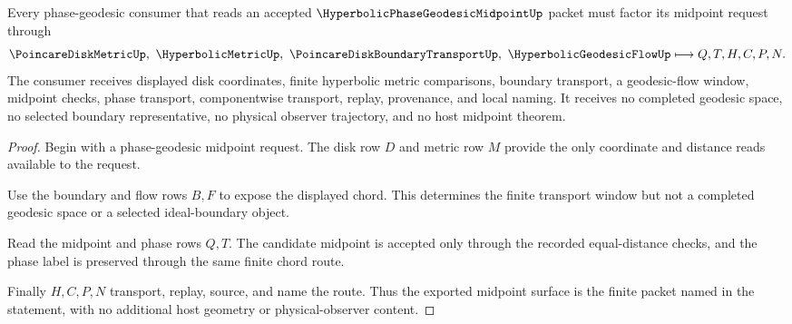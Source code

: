 \begin{theorem}
\label{thm:hyperbolic-phase-geodesic-midpoint-route}
Every phase-geodesic consumer that reads an accepted $\HyperbolicPhaseGeodesicMidpointUp$ packet must factor its midpoint request through
$$
\PoincareDiskMetricUp,\ \HyperbolicMetricUp,\ \PoincareDiskBoundaryTransportUp,\ \HyperbolicGeodesicFlowUp
\longmapsto
Q,T,H,C,P,N .
$$
The consumer receives displayed disk coordinates, finite hyperbolic metric comparisons, boundary transport, a geodesic-flow window, midpoint checks, phase transport, componentwise transport, replay, provenance, and local naming. It receives no completed geodesic space, no selected boundary representative, no physical observer trajectory, and no host midpoint theorem.
\end{theorem}
\begin{proof}
Begin with a phase-geodesic midpoint request. The disk row $D$ and metric row $M$ provide the only coordinate and distance reads available to the request.

Use the boundary and flow rows $B,F$ to expose the displayed chord. This determines the finite transport window but not a completed geodesic space or a selected ideal-boundary object.

Read the midpoint and phase rows $Q,T$. The candidate midpoint is accepted only through the recorded equal-distance checks, and the phase label is preserved through the same finite chord route.

Finally $H,C,P,N$ transport, replay, source, and name the route. Thus the exported midpoint surface is the finite packet named in the statement, with no additional host geometry or physical-observer content.
\end{proof}



